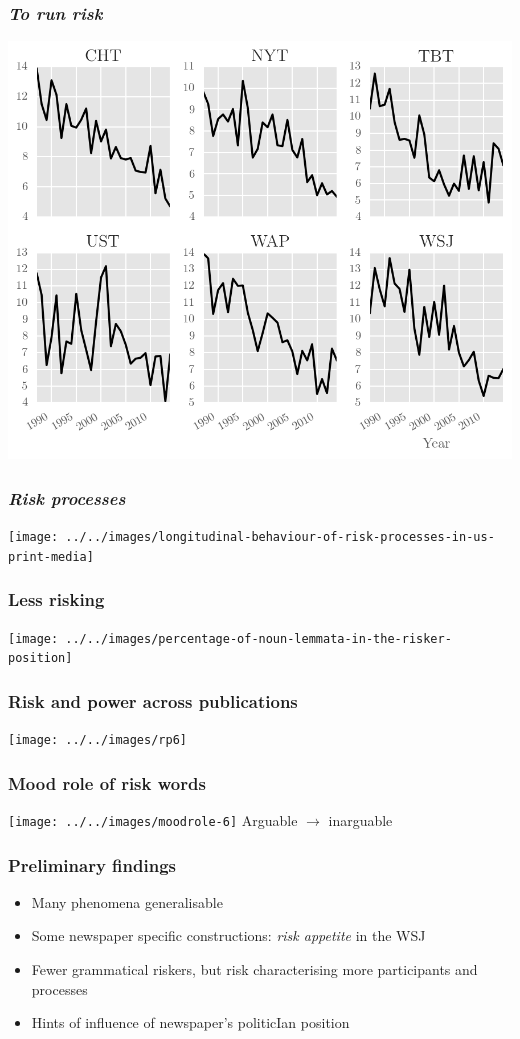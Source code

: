 \documentclass{beamer}       %
\begin{document}
\begin{frame}\frametitle{\emph{To run risk}}
    \centering
    \includegraphics[width=.9\textwidth]{../../images/to-run-risk}
\end{frame}

\begin{frame}\frametitle{\emph{Risk processes}}
    \centering
    \texttt{[image: ../../images/longitudinal-behaviour-of-risk-processes-in-us-print-media]}
\end{frame}

\begin{frame}\frametitle{Less risking}
    \centering
    \texttt{[image: ../../images/percentage-of-noun-lemmata-in-the-risker-position]}
\end{frame}

\begin{frame}\frametitle{Risk and power across publications}
    \centering
    \texttt{[image: ../../images/rp6]}
\end{frame}

\begin{frame}
    \frametitle{Mood role of risk words}
    \centering
    \texttt{[image: ../../images/moodrole-6]}
    Arguable $\rightarrow$ inarguable
\end{frame}


\begin{frame}\frametitle{Preliminary findings}
\begin{itemize}
    \item Many phenomena generalisable
    \item Some newspaper specific constructions: \emph{risk appetite} in the WSJ
    \item Fewer grammatical riskers, but risk characterising more participants and processes
    \item Hints of influence of newspaper's politicIan position
\end{itemize}
\end{frame}
\end{document}

